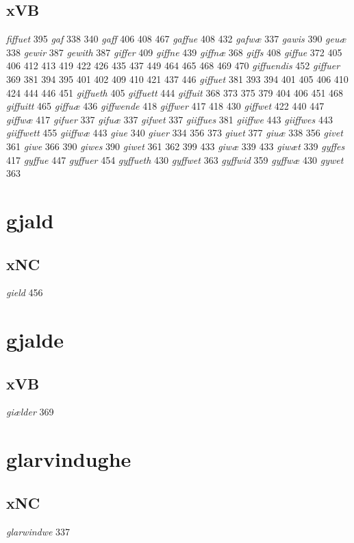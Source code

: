 \documentclass[a4paper,twocolumn]{article}
\begin{document}
\subsection{xVB}
\label{sec:org5178d67}
\emph{fiffuet} 395 \emph{gaf} 338 340 \emph{gaff} 406 408 467 \emph{gaffue} 408 432 \emph{gafwæ} 337 \emph{gawis} 390 \emph{geuæ} 338 \emph{gewir} 387 \emph{gewith} 387 \emph{giffer} 409 \emph{giffne} 439 \emph{giffnæ} 368 \emph{giffs} 408 \emph{giffue} 372 405 406 412 413 419 422 426 435 437 449 464 465 468 469 470 \emph{giffuendis} 452 \emph{giffuer} 369 381 394 395 401 402 409 410 421 437 446 \emph{giffuet} 381 393 394 401 405 406 410 424 444 446 451 \emph{giffueth} 405 \emph{giffuett} 444 \emph{giffuit} 368 373 375 379 404 406 451 468 \emph{giffuitt} 465 \emph{giffuæ} 436 \emph{giffwende} 418 \emph{giffwer} 417 418 430 \emph{giffwet} 422 440 447 \emph{giffwæ} 417 \emph{gifuer} 337 \emph{gifuæ} 337 \emph{gifwet} 337 \emph{giiffues} 381 \emph{giiffwe} 443 \emph{giiffwes} 443 \emph{giiffwett} 455 \emph{giiffwæ} 443 \emph{giue} 340 \emph{giuer} 334 356 373 \emph{giuet} 377 \emph{giuæ} 338 356 \emph{givet} 361 \emph{giwe} 366 390 \emph{giwes} 390 \emph{giwet} 361 362 399 433 \emph{giwæ} 339 433 \emph{giwæt} 339 \emph{gyffes} 417 \emph{gyffue} 447 \emph{gyffuer} 454 \emph{gyffueth} 430 \emph{gyffwet} 363 \emph{gyffwid} 359 \emph{gyffwæ} 430 \emph{gywet} 363 
\section{gjald}
\label{sec:orgd912273}
\subsection{xNC}
\label{sec:org421fb61}
\emph{gield} 456 
\section{gjalde}
\label{sec:org2b73304}
\subsection{xVB}
\label{sec:org17e1eba}
\emph{giælder} 369 
\section{glarvindughe}
\label{sec:org974ff5f}
\subsection{xNC}
\label{sec:org15b2f82}
\emph{glarwindwe} 337 
\end{document}
